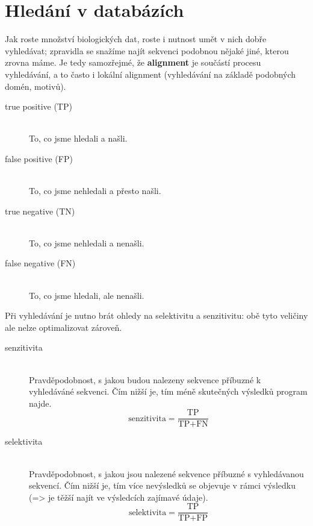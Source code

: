 \documentclass[DIV=8]{scrreprt}
\begin{document}
\chapter{Hledání v databázích} \label{Hledání v databázích}


Jak roste množství biologických dat, roste i nutnost umět v nich dobře vyhledávat; zpravidla se snažíme najít sekvenci podobnou nějaké jiné, kterou zrovna máme. Je tedy samozřejmé, že \textbf{alignment} je součástí procesu vyhledávání, a to často i lokální alignment (vyhledávání na základě podobných domén, motivů).

\begin{description}
\item[true positive (TP)]\hfill \\
To, co jsme hledali a našli.


\item[false positive (FP)]\hfill \\
To, co jsme nehledali a přesto našli.


\item[true negative (TN)]\hfill \\
To, co jsme nehledali a nenašli.


\item[false negative (FN)]\hfill \\
To, co jsme hledali, ale nenašli.

\end{description}


Při vyhledávání je nutno brát ohledy na selektivitu a senzitivitu: obě tyto veličiny ale nelze optimalizovat zároveň.

\begin{description}
\item[senzitivita]\hfill \\
Pravděpodobnost, s jakou budou nalezeny sekvence příbuzné k vyhledáváné sekvenci. Čím nižší je, tím méně skutečných výsledků program najde.
\[\text{senzitivita} = \frac{\text{TP}}{\text{TP} + \text{FN}}\]


\item[selektivita]\hfill \\
Pravděpodobnost, s jakou jsou nalezené sekvence příbuzné s vyhledávanou sekvencí. Čím nižší je, tím více nevýsledků se objevuje v rámci výsledku (=> je těžší najít ve výsledcích zajímavé údaje).
\[\text{selektivita} = \frac{\text{TP}}{\text{TP} + \text{FP}}\]

\end{description}
\end{document}
